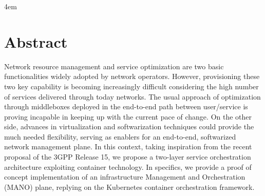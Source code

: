 \cleardoublepage
{}

\thispagestyle{empty}

\vspace*{\fill}
\par
\begingroup
\leftskip4em
\rightskip\leftskip
\section*{\centering Abstract}
Network resource management and service optimization are two basic
functionalities widely adopted by network operators. However, provisioning these
two key capability is becoming increasingly difficult considering the high
number of services delivered through today networks. The usual approach of
optimization through middleboxes deployed in the end-to-end path between
user/service is proving incapable in keeping up with the current pace of change.
On the other side, advances in virtualization and softwarization techniques
could provide the much needed flexibility, serving as enablers for an
end-to-end, softwarized network management plane. In this context, taking
inspiration from the recent proposal of the 3GPP Release 15, we propose a
two-layer service orchestration architecture exploiting container technology. In
specifics, we provide a proof of concept implementation of an infrastructure
Management and Orchestration (MANO) plane, replying on the Kubernetes container
orchestration framework.
\par
\endgroup
\vspace*{\fill}

